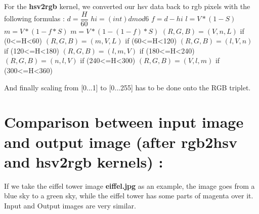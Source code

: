 \documentclass{article}
\begin{document}
For the \textbf{hsv2rgb} kernel, we converted our hsv data back to rgb pixels with the following formulas :\newline
\newline
$d = \dfrac{H}{60}$\newline
\newline
$hi = (int)dmod6$\newline
\newline
$f = d - hi$\newline
\newline
$l = V * (1 - S) $\newline
\newline
$m = V * (1 - f*S)$\newline
\newline
$m = V * (1 - (1 - f)*S)$\newline
\newline
$(R,G,B) = (V,n,L)$ if (0<=H<60)\newline
$(R,G,B) = (m,V,L)$ if (60<=H<120)\newline
$(R,G,B) = (l,V,n)$ if (120<=H<180)\newline
$(R,G,B) = (l,m,V)$ if (180<=H<240)\newline
$(R,G,B) = (n,l,V)$ if (240<=H<300)\newline
$(R,G,B) = (V,l,m)$ if (300<=H<360)\newline
\newline 

And finally scaling from [0...1] to [0...255] has to be done onto the RGB triplet.\newline

\section{Comparison between input image and output image (after rgb2hsv and hsv2rgb kernels) :}\newline

If we take the eiffel tower image \textbf{eiffel.jpg} as an example, the image goes from a blue sky to a green sky, while the eiffel tower has some parts of magenta over it. Input and Output images are very similar.
\end{document}
